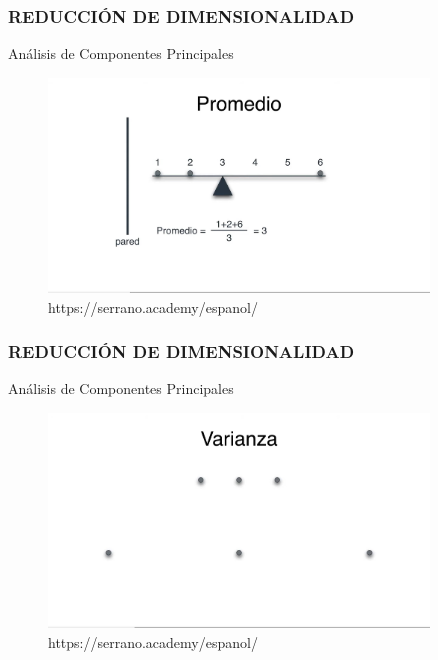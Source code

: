 \documentclass{beamer}
\begin{document}
\begin{frame}
	\frametitle{REDUCCIÓN DE DIMENSIONALIDAD}
	\begin{block}{Análisis de Componentes Principales}	
		\begin{figure}
			\includegraphics[width=0.9\textwidth]{PCA/IMG_3544.jpg}
			\caption{https://serrano.academy/espanol/}
		\end{figure}
	\end{block}
\end{frame}


\begin{frame}
	\frametitle{REDUCCIÓN DE DIMENSIONALIDAD}
	\begin{block}{Análisis de Componentes Principales}	
		\begin{figure}
			\includegraphics[width=0.9\textwidth]{PCA/IMG_3545.jpg}
			\caption{https://serrano.academy/espanol/}
		\end{figure}
	\end{block}
\end{frame}
\end{document}
